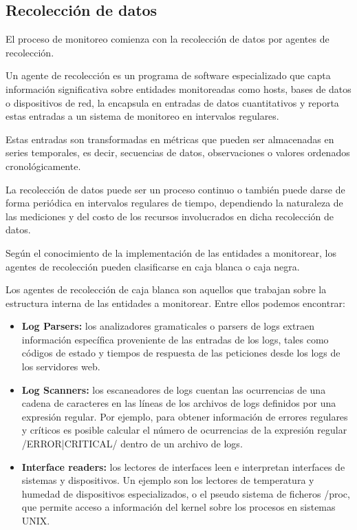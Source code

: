 \subsection{Recolección de datos}
\label{recoleccion_de_datos}
El proceso de monitoreo comienza con la recolección de datos por agentes de recolección.

Un agente de recolección es un programa de software especializado que capta información significativa sobre entidades monitoreadas como hosts, bases de datos o dispositivos de red, la encapsula en entradas de datos cuantitativos y reporta estas entradas a un sistema de monitoreo en intervalos regulares.

Estas entradas son transformadas en métricas que pueden ser almacenadas en series temporales, es decir, secuencias de datos, observaciones o valores ordenados cronológicamente.

La recolección de datos puede ser un proceso continuo o también puede darse de forma periódica en intervalos regulares de tiempo, dependiendo la naturaleza de las mediciones y del costo de los recursos involucrados en dicha recolección de datos.

Según el conocimiento de la implementación de las entidades a monitorear, los agentes de recolección pueden clasificarse en caja blanca o caja negra.

Los agentes de recolección de caja blanca son aquellos que trabajan sobre la estructura interna de las entidades a monitorear. Entre ellos podemos encontrar:

\begin{itemize}
  \item \textbf{Log Parsers:} los analizadores gramaticales o parsers de logs extraen información específica proveniente de las entradas de los logs, tales como códigos de estado y tiempos de respuesta de las peticiones desde los logs de los servidores web.

  \item \textbf{Log Scanners:} los escaneadores de logs cuentan las ocurrencias de una cadena de caracteres en las líneas de los archivos de logs definidos por una expresión regular. Por ejemplo, para obtener información de errores regulares y críticos es posible calcular el número de ocurrencias de la expresión regular /ERROR|CRITICAL/ dentro de un archivo de logs.

  \item \textbf{Interface readers:} los lectores de interfaces leen e interpretan interfaces de sistemas y dispositivos. Un ejemplo son los lectores de temperatura y humedad de dispositivos especializados, o el pseudo sistema de ficheros /proc, que permite acceso a información del kernel sobre los procesos en sistemas UNIX.
\end{itemize}

